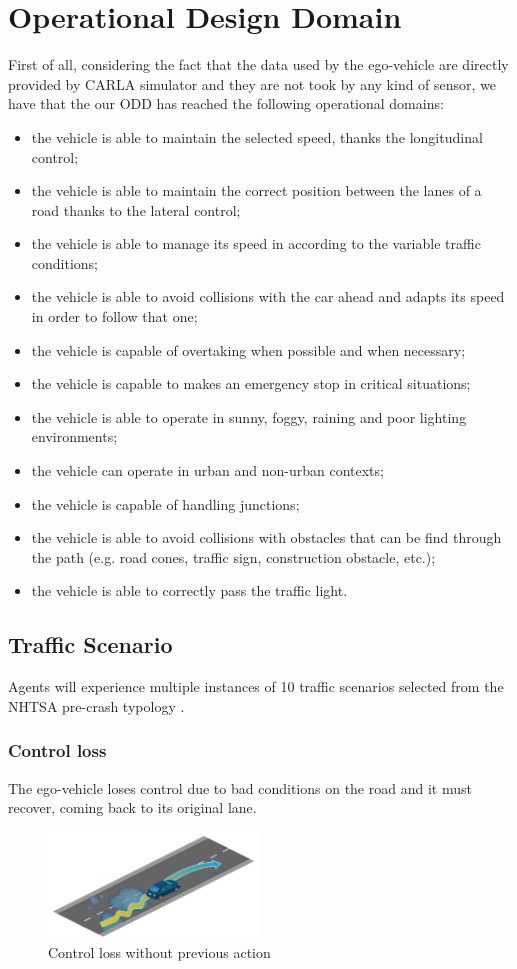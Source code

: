 \documentclass{article}
\begin{document}
\section{Operational Design Domain}
First of all, considering the fact that the data used by the ego-vehicle are directly provided by CARLA simulator and they are not took by any kind of sensor, we have 
that the our ODD has reached the following operational domains:
\begin{itemize}
    \item the vehicle is able to maintain the selected speed, thanks the longitudinal control;
    \item the vehicle is able to maintain the correct position between the lanes of a road thanks to the lateral control;
    \item the vehicle is able to manage its speed in according to the variable traffic conditions;
    \item the vehicle is able to avoid collisions with the car ahead and adapts its speed in order to follow that one;
    \item the vehicle is capable of overtaking when possible and when necessary;
    \item the vehicle is capable to makes an emergency stop in critical situations;
    \item the vehicle is able to operate in sunny, foggy, raining and poor lighting environments;
    \item the vehicle can operate in urban and non-urban contexts;
    \item the vehicle is capable of handling junctions;
    \item the vehicle is able to avoid collisions with obstacles that can be find through the path (e.g. road cones, traffic sign, construction obstacle, etc.);
    \item the vehicle is able to correctly pass the traffic light.
\end{itemize}

\subsection{Traffic Scenario}
Agents will experience multiple instances of 10 traffic scenarios selected from the NHTSA pre-crash typology \cite{NHTSA}. 

\subsubsection{Control loss}
The ego-vehicle loses control due to bad conditions on the road and it must recover, coming back to its original lane.
\begin{figure}[h]
    \centering
    \includegraphics[width=0.5\textwidth]{img/TR01.png}
    \caption{Control loss without previous action} \label{Scenario_controlLoss}
\end{figure}
\end{document}

